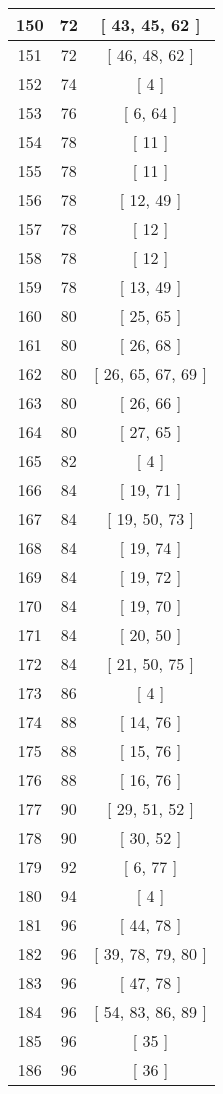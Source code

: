 \begin{center}
\begin{longtable}[H]{|| c c c ||}
150 & 72 & [ 43, 45, 62 ]
\\\hline
151 & 72 & [ 46, 48, 62 ]
\\\hline
152 & 74 & [ 4 ]
\\\hline
153 & 76 & [ 6, 64 ]
\\\hline
154 & 78 & [ 11 ]
\\\hline
155 & 78 & [ 11 ]
\\\hline
156 & 78 & [ 12, 49 ]
\\\hline
157 & 78 & [ 12 ]
\\\hline
158 & 78 & [ 12 ]
\\\hline
159 & 78 & [ 13, 49 ]
\\\hline
160 & 80 & [ 25, 65 ]
\\\hline
161 & 80 & [ 26, 68 ]
\\\hline
162 & 80 & [ 26, 65, 67, 69 ]
\\\hline
163 & 80 & [ 26, 66 ]
\\\hline
164 & 80 & [ 27, 65 ]
\\\hline
165 & 82 & [ 4 ]
\\\hline
166 & 84 & [ 19, 71 ]
\\\hline
167 & 84 & [ 19, 50, 73 ]
\\\hline
168 & 84 & [ 19, 74 ]
\\\hline
169 & 84 & [ 19, 72 ]
\\\hline
170 & 84 & [ 19, 70 ]
\\\hline
171 & 84 & [ 20, 50 ]
\\\hline
172 & 84 & [ 21, 50, 75 ]
\\\hline
173 & 86 & [ 4 ]
\\\hline
174 & 88 & [ 14, 76 ]
\\\hline
175 & 88 & [ 15, 76 ]
\\\hline
176 & 88 & [ 16, 76 ]
\\\hline
177 & 90 & [ 29, 51, 52 ]
\\\hline
178 & 90 & [ 30, 52 ]
\\\hline
179 & 92 & [ 6, 77 ]
\\\hline
180 & 94 & [ 4 ]
\\\hline
181 & 96 & [ 44, 78 ]
\\\hline
182 & 96 & [ 39, 78, 79, 80 ]
\\\hline
183 & 96 & [ 47, 78 ]
\\\hline
184 & 96 & [ 54, 83, 86, 89 ]
\\\hline
185 & 96 & [ 35 ]
\\\hline
186 & 96 & [ 36 ]
\\\hline

\end{longtable}
\end{center}
